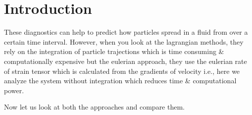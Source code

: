 \documentclass[../report.tex]{subfiles}
\begin{document}
{\let\clearpage\relax \chapter{Introduction}}

These diagnostics can help to predict how particles spread in a fluid from over a certain time interval. However, when you look at the lagrangian methods, they rely on the integration of particle trajections which is time consuming \& computationally expensive but the eulerian approach, they use the eulerian rate of strain tensor which is calculated from the gradients of velocity i.e., here we analyze the system without integration which reduces time \& computational power. \par 

Now let us look at both the approaches and compare them.
\end{document}
